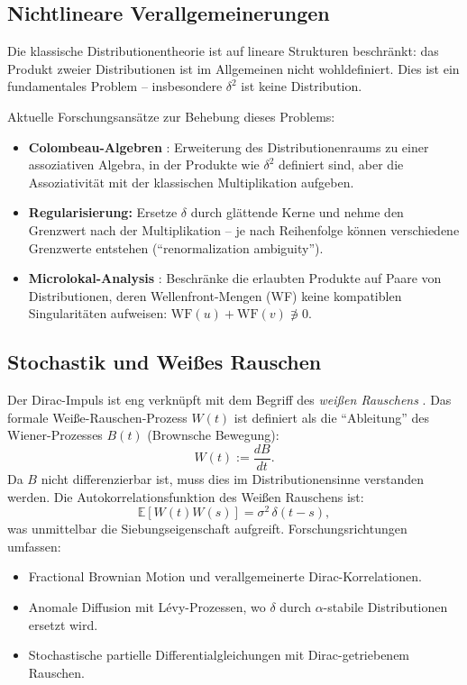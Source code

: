﻿\documentclass[a4paper,12pt]{article}
\theoremstyle{definition}
\begin{document}
\subsection{Nichtlineare Verallgemeinerungen}

Die klassische Distributionentheorie ist auf lineare Strukturen beschr\"ankt: das Produkt
zweier Distributionen ist im Allgemeinen nicht wohldefiniert. Dies ist ein fundamentales
Problem -- insbesondere $\delta^2$ ist keine Distribution.

Aktuelle Forschungsans\"atze zur Behebung dieses Problems:
\begin{itemize}
    \item \textbf{Colombeau-Algebren} \cite{colombeau1984new}: Erweiterung des
          Distributionenraums zu einer assoziativen Algebra, in der Produkte wie
          $\delta^2$ definiert sind, aber die Assoziativit\"at mit der klassischen
          Multiplikation aufgeben.
    \item \textbf{Regularis\-ierung:} Ersetze $\delta$ durch gl\"attende Kerne und
          nehme den Grenzwert nach der Multiplikation -- je nach Reihenfolge k\"onnen
          verschiedene Grenzwerte entstehen (``renormalization ambiguity'').
    \item \textbf{Microlokal-Analysis} \cite{hormander2003analysis}: Beschr\"anke
          die erlaubten Produkte auf Paare von Distributionen, deren Wellenfront-Mengen
          (WF) keine kompatiblen Singularit\"aten aufweisen:
          $\mathrm{WF}(u) + \mathrm{WF}(v) \not\ni 0$.
\end{itemize}

\subsection{Stochastik und Wei{\ss}es Rauschen}

Der Dirac-Impuls ist eng verkn\"upft mit dem Begriff des \emph{wei{\ss}en Rauschens}
\cite{ito1944stochastic}. Das formale Wei{\ss}e-Rauschen-Prozess $W(t)$ ist definiert als
die ``Ableitung'' des Wiener-Prozesses $B(t)$ (Brownsche Bewegung):
\[
W(t) := \frac{dB}{dt}.
\]
Da $B$ nicht differenzierbar ist, muss dies im Distributionensinne verstanden werden.
Die Autokorrelationsfunktion des Wei{\ss}en Rauschens ist:
\[
\mathbb{E}[W(t)W(s)] = \sigma^2\,\delta(t-s),
\]
was unmittelbar die Siebungseigenschaft aufgreift. Forschungsrichtungen umfassen:
\begin{itemize}
    \item Fractional Brownian Motion und verallgemeinerte Dirac-Korrelationen.
    \item Anomale Diffusion mit L\'evy-Prozessen, wo $\delta$ durch $\alpha$-stabile
          Distributionen ersetzt wird.
    \item Stochastische partielle Differentialgleichungen mit Dirac-getriebenem Rauschen.
\end{itemize}
\end{document}
